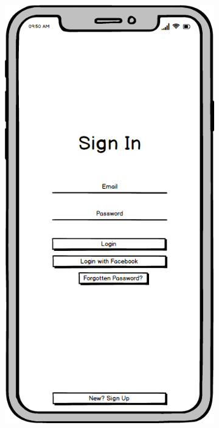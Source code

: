 \begin{figure}[H]
\begin{subfigure}[b]{0.3\textwidth}
        \label{fig:start}
    \end{subfigure}
    \hfill
    \begin{subfigure}[b]{0.3\textwidth}
        \centering
        \includegraphics[width=\textwidth]{./graphics/design/Sign In.png}

\end{subfigure}
\end{figure}
